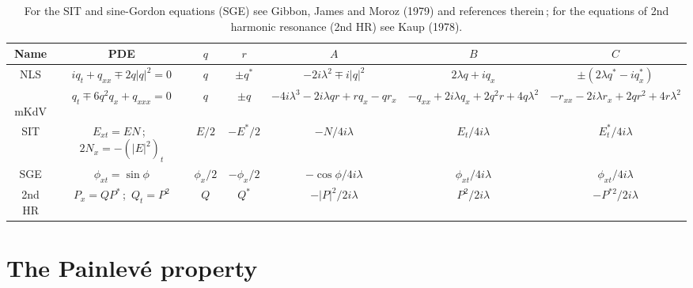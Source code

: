 \documentclass[11pt]{article}
\begin{document}
\par\smallskip\noindent
\begin{table}
{\tiny
\begin{tabular}{||c|c|c|c|c|c|c||}
	\hline
Name & PDE & $q$ & $r$ & $A$ & $B$ & $C$\\\hline\hline
NLS  & $iq_{t} + q_{xx} \mp 2 q|q|^{2} = 0$ & $q$ & $\pm q^{*}$ & $-2i\lambda^{2} \mp i |q|^{2}$ & $2\lambda q + iq_{x}$ 
& $\pm(2\lambda q^{*} - iq_{x}^{*})$\\\hline\
mKdV & $q_{t} \mp 6q^{2}q_{x} + q_{xxx}=0$ & $q$  & $\pm q$ & $-4i\lambda^{3} - 2i\lambda qr + rq_{x}-qr_{x}$ & 
$-q_{xx} + 2i\lambda q_{x} + 2q^{2}r + 4q\lambda^{2}$ & $-r_{xx} - 2i\lambda r_{x} + 2q r^{2} + 4r\lambda^{2}$\\\hline
SIT & $E_{xt} = EN$\,;~$2N_{x} = -(|E|^{2})_{t}$ & $E/2$ & $-E^{*}/2$ & $-N/4i\lambda$ & $E_{t}/4i\lambda$ & 
$E_{t}^{*}/4i\lambda$\\\hline
SGE & $\phi_{xt} = \sin\phi$ & $\phi_{x}/2$ & $-\phi_{x}/2$ & $-\cos\phi/4i\lambda$ & $\phi_{xt}/4i\lambda$ & $\phi_{xt}/4i\lambda$\\\hline
2nd HR & $P_{x} = Q P^{*}$\,;~$Q_{t} = P^{2}$ & $Q$ & $Q^{*}$ & $- |P|^{2}/2i\lambda$ & $P^{2}/2i\lambda$ & $-P^{*2}/2i\lambda$\\
\hline
\end{tabular}}
\caption{\scriptsize For the SIT and sine-Gordon equations (SGE) see Gibbon, James and Moroz (1979) and references therein\,; for the equations of 2nd harmonic resonance (2nd HR) see Kaup (1978).}
\end{table}


\section{\large The Painlev\'e property}
\end{document}
